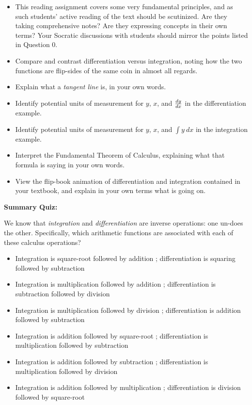 \begin{itemize}
\item{} This reading assignment covers some very fundamental principles, and as such students' active reading of the text should be scutinized.  Are they taking comprehensive notes?  Are they expressing concepts in their own terms?  Your Socratic discussions with students should mirror the points listed in Question 0.
\item{} Compare and contrast differentiation versus integration, noting how the two functions are flip-sides of the same coin in almost all regards.
\item{} Explain what a {\it tangent line} is, in your own words.
\item{} Identify potential units of measurement for $y$, $x$, and $dy \over dx$ in the differentiation example.
\item{} Identify potential units of measurement for $y$, $x$, and $\int y \> dx$ in the integration example.
\item{} Interpret the Fundamental Theorem of Calculus, explaining what that formula is saying in your own words.
\item{} View the flip-book animation of differentiation and integration contained in your textbook, and explain in your own terms what is going on.
\end{itemize}








\vfil \eject

\noindent
{\bf Summary Quiz:}

We know that {\it integration} and {\it differentiation} are inverse operations: one un-does the other.  Specifically, which arithmetic functions are associated with each of these calculus operations?

\begin{itemize}
\item{} Integration is square-root followed by addition ; differentiation is squaring followed by subtraction
\vskip 10pt 
\item{} Integration is multiplication followed by addition ; differentiation is subtraction followed by division
\vskip 10pt 
\item{} Integration is multiplication followed by division ; differentiation is addition followed by subtraction
\vskip 10pt 
\item{} Integration is addition followed by square-root ; differentiation is multiplication followed by subtraction
\vskip 10pt 
\item{} Integration is addition followed by subtraction ; differentiation is multiplication followed by division
\vskip 10pt 
\item{} Integration is addition followed by multiplication ; differentiation is division followed by square-root
\end{itemize}






